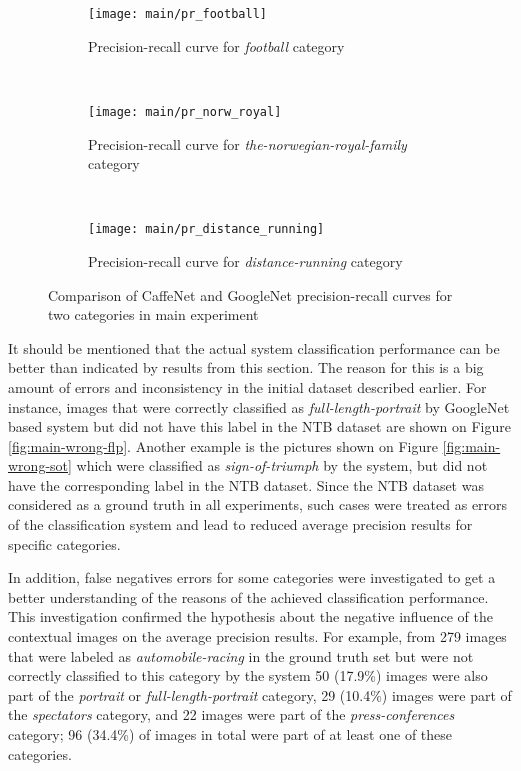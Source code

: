     \begin{figure}[h!]
        \centering
        \begin{subfigure}[a]{0.8\textwidth}
            \texttt{[image: main/pr\_football]}
            \caption{Precision-recall curve for \textit{football} category}
            \label{fig:main-pr-football}
        \end{subfigure}
        \\
        \begin{subfigure}[a]{0.8\textwidth}
            \texttt{[image: main/pr\_norw\_royal]}
            \caption{Precision-recall curve for \textit{the-norwegian-royal-family} category}
            \label{fig:main-pr-royal}
        \end{subfigure}
        \\
        \begin{subfigure}[a]{0.8\textwidth}
            \texttt{[image: main/pr\_distance\_running]}
            \caption{Precision-recall curve for \textit{distance-running} category}
            \label{fig:main-pr-distance-running}
        \end{subfigure}
        \caption[Main experiment. Precision-recall curves CaffeNet vs GoogleNet]{Comparison of CaffeNet and GoogleNet precision-recall curves for two categories in main experiment}
        \label{main-pr}
    \end{figure}
    
    It should be mentioned that the actual system classification performance can be better than indicated by results from this section. The reason for this is a big amount of errors and inconsistency in the initial dataset described earlier. For instance, images that were correctly classified as \textit{full-length-portrait} by GoogleNet based system but did not have this label in the NTB dataset are shown on Figure \ref{fig:main-wrong-flp}. Another example is the pictures shown on Figure \ref{fig:main-wrong-sot} which were classified as \textit{sign-of-triumph} by the system, but did not have the corresponding label in the NTB dataset. Since the NTB dataset was considered as a ground truth in all experiments, such cases were treated as errors of the classification system and lead to reduced average precision results for specific categories.

    In addition, false negatives errors for some categories were investigated to get a better understanding of the reasons of the achieved classification performance. This investigation confirmed the hypothesis about the negative influence of the contextual images on the average precision results. For example, from 279 images that were labeled as \textit{automobile-racing} in the ground truth set but were not correctly classified to this category by the system 50 (17.9\%) images were also part of the \textit{portrait} or \textit{full-length-portrait} category, 29 (10.4\%) images were part of the \textit{spectators} category, and 22 images were part of the \textit{press-conferences} category; 96 (34.4\%) of images in total were part of at least one of these categories.
    
